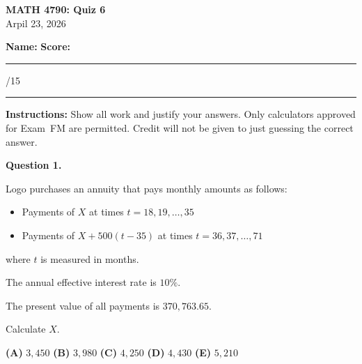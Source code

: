 \documentclass[11pt]{article}
\begin{document}
\begin{center}
    {\Large \textbf{MATH 4790: Quiz 6}}\\[0.3em]
    Arpil 23, 2026
\end{center}

\vspace{1em}

\textbf{Name:} \hfill \textbf{Score:} \rule{1.5cm}{0.4pt}/15

\vspace{1em}

\hrule
\vspace{1em}

\textbf{Instructions:} Show all work and justify your answers. Only calculators approved for Exam~FM are permitted. Credit will not be given to just guessing the correct answer.

\vspace{1em}


\noindent\textbf{Question 1.}  

Logo purchases an annuity that pays monthly amounts as follows:

\begin{itemize}
    \item Payments of $X$ at times $t = 18, 19, \ldots, 35$
    \item Payments of $X + 500(t - 35)$ at times $t = 36, 37, \ldots, 71$
\end{itemize}

where $t$ is measured in months.

The annual effective interest rate is $10\%$.

The present value of all payments is $370{,}763.65$.

Calculate $X$.

\medskip

\begin{center}

\textbf{(A)} $3{,}450$
\hspace{1cm}
\textbf{(B)} $3{,}980$
\hspace{1cm}
\textbf{(C)} $4{,}250$
\hspace{1cm}
\textbf{(D)} $4{,}430$
\hspace{1cm}
\textbf{(E)} $5{,}210$

\end{center}

\newpage

\end{document}
